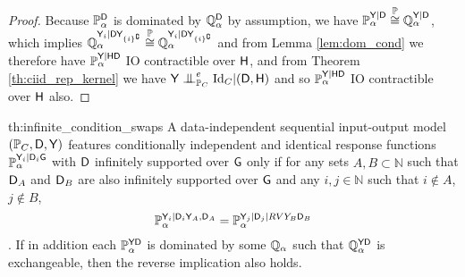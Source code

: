 \begin{proof}
Because $\mathbb{P}_\alpha^{\mathsf{D}}$ is dominated by $\mathbb{Q}_\alpha^{\mathsf{D}}$ by assumption, we have $\mathbb{P}_\alpha^{\mathsf{Y}|\mathsf{D}} \overset{\mathbb{P}}{\cong} \mathbb{Q}_\alpha^{\mathsf{Y}|\mathsf{D}}$, which implies $\mathbb{Q}_\alpha^{\mathsf{Y}_i|\mathsf{D}\mathsf{Y}_{\{i\}^{\complement}}}\overset{\mathbb{P}}{\cong} \mathbb{Q}_\alpha^{\mathsf{Y}_i|\mathsf{D}\mathsf{Y}_{\{i\}^{\complement}}}$ and from Lemma \ref{lem:dom_cond} we therefore have $\mathbb{P}_\alpha^{\mathsf{Y}|\mathsf{HD}}$ IO contractible over $\mathsf{H}$, and from Theorem \ref{th:ciid_rep_kernel} we have $\RV{Y}\CI^e_{\prob{P}_C} \text{Id}_C | (\RV{D},\RV{H})$ and so $\mathbb{P}_\alpha^{\mathsf{Y}|\mathsf{HD}}$ IO contractible over $\mathsf{H}$ also.
\end{proof}


\begin{reptheorem}{th:infinite_condition_swaps}
A data-independent sequential input-output model $(\mathbb{P}_C,\mathsf{D},\mathsf{Y})$ features conditionally independent and identical response functions $\mathbb{P}_\alpha^{\mathsf{Y}_i|\mathsf{D}_i\mathsf{G}}$ with $\mathsf{D}$ infinitely supported over $\mathsf{G}$ only if for any sets $A,B\subset \mathbb{N}$ such that $\mathsf{D}_A$ and $\mathsf{D}_B$ are also infinitely supported over $\mathsf{G}$ and any $i,j\in \mathbb{N}$ such that $i\not\in A$, $j\not\in B$, $$\mathbb{P}_\alpha^{\mathsf{Y}_i|\mathsf{D}_i\mathsf{Y}_A,\mathsf{D}_A}=\mathbb{P}_\alpha^{\mathsf{Y}_j|\mathsf{D}_j|RV{Y}_B\mathsf{D}_B}$$.  If in addition each $\mathbb{P}_\alpha^{\mathsf{YD}}$ is dominated by some $\mathbb{Q}_\alpha$ such that $\mathbb{Q}_\alpha^{\mathsf{Y}\mathsf{D}}$ is exchangeable, then the reverse implication also holds.
\end{reptheorem}

